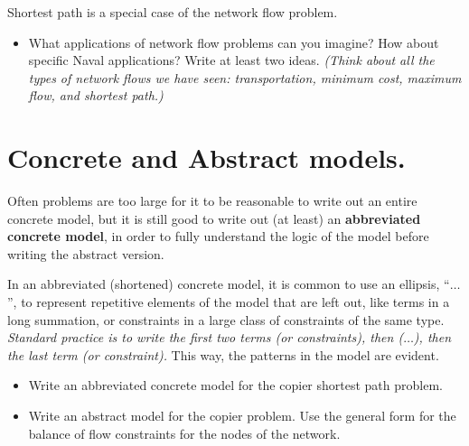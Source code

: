 \documentclass[11pt]{article}
\theoremstyle{definition}
\newcommand{\answerbox}[3]{%
  \fbox{%
    \begin{minipage}[#1]{#2}
      \hfill\vspace{#3}
    \end{minipage}
  }
}
\newcommand{\answerboxone}[2]{%
  \answerbox{#1}{6.0in}{#2} 
}
\newcommand{\wordbox}{\answerbox{c}{1.2in}{.7cm}}
\newcommand{\catbox}{\answerbox{c}{.5in}{.7cm}}
\begin{document}
\begin{tcolorbox}
Shortest path is a special case of the \wordbox \catbox network flow problem.
\end{tcolorbox}

\begin{itemize}
\item What applications of network flow problems can you imagine? How about specific Naval applications?  Write  at least two ideas.  \emph{(Think about all the types of network flows we have seen: transportation, minimum cost, maximum flow, and shortest path.)}

\answerboxone{c}{1 in}
\end{itemize}

\newpage
\section{Concrete and Abstract models.}

Often problems are too large for it to be reasonable to write out an entire concrete model, but it is still good to write out (at least) an \textbf{abbreviated concrete model}, in order to fully understand the logic of the model before writing the abstract version. 

In an abbreviated (shortened) concrete model, it is common to use an ellipsis, ``$\dots$'', to represent repetitive elements of the model that are left out, like terms in a long summation, or constraints in a large class of constraints of the same type.  \emph{Standard practice is to write the first two terms (or constraints), then ($\dots$), then the last term (or constraint).}  This way, the patterns in the model are evident.

\begin{itemize}
\item Write an abbreviated concrete model for the copier shortest path problem. \\  \answerboxone{c}{4.5in}
\newpage
\item Write an abstract model for the copier problem.  Use the general form for the balance of flow constraints for the nodes of the network.\\  \answerboxone{c}{4.45 in}
\end{itemize}
\end{document}
